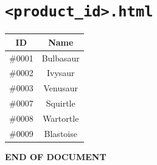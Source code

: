 \documentclass[a4paper,12pt]{article} %
\begin{document}
\section{\texttt{<product\_id>.html}} 
\begin{tabular}{|c|c|}
    \hline
    \textbf{ID} & \textbf{Name}\\
    \hline
    \#0001 & Bulbasaur\\
    \hline
    \#0002 & Ivysaur\\
    \hline
    \#0003 & Venusaur\\
    \hline
    \#0007 & Squirtle\\
    \hline
    \#0008 & Wartortle\\
    \hline
    \#0009 & Blastoise\\
    \hline
\end{tabular}






\begin{center}
    \vspace{5em}
    \textbf{END OF DOCUMENT}
\end{center}
\end{document}
